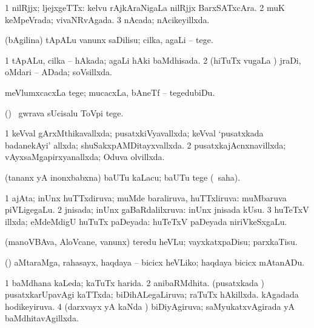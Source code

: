 {\bentry
{} 
\gl{\gu}
\expl{}
\bmng
\bnum
\num{1} nilRjjx; ljejxgeTTx:  kelvu rAjkAraNigaLa nilRjjx BarxSATxcAra. 
\num{2} muK keMpeVrada; vivaNRvAgada. 
\num{3} nAcada; nAcikeyillxda. 
\enum
\emng
\eentry

\bentry
{} 
\gl{\sakirx}
\expl{}
\bmng
(bAgilina) tApALu \mo vanunx saDilisu; cilka, agaLi -- tege. 
\emng
\eentry

\bentry
{} 
\gl{\gu}
\expl{}
\bmng
\bnum
\num{1} tApALu, cilka -- hAkada; agaLi hAki baMdhisada. 
\num{2} (hiTuTx \mo vugaLa \vi) jraDi, oMdari -- ADada; soVsillxda. 
\enum
\emng
\eentry

\bentry
{} 
\gl{\sakirx}
\expl{}
\bmng
meVlumxcacxLa tege; mucacxLa, bAneTf -- tegedubiDu. 
\emng

\noindent 
\gl{\akirx}
\expl{}
\bmng
(\pArxparx) \kanmu\ gwrava sUcisalu ToVpi tege. 
\emng
\eentry
 
\bentry
{} 
\gl{\gu}
\expl{}
\bmng
\bnum
\num{1} keVval gArxMthikavallxda; pusatxkiVyavallxda; keVval `pusatxkada badanekAyi' allxda; shuSakxpAMDitayxvallxda. 
\num{2} pusatxkajAcnxnavillxda; vAyxsaMgapirxyanallxda; Oduva olvillxda. 
\enum
\emng
\eentry

\bentry
{} 
\gl{\akirx}
\expl{}
\bmng
(tananx yA inonxbabxna) baUTu kaLacu; baUTu tege (\akirx\ saha). 
\emng
\eentry

\bentry
{} 
\gl{\gu}
\expl{}
\bmng
\bnum
\num{1} ajAta; inUnx huTTxdiruva; muMde baraliruva, huTTxliruva:  muMbaruva piVLigegaLu. 
\num{2} jnisada; inUnx gaBaRdalilxruva:  inUnx jnisada kUsu. 
\num{3} huTeTxV illxda; eMdeMdigU huTuTx paDeyada:  huTeTxV paDeyada niriVkeSxgaLu. 
\enum
\emng
\eentry

\bentry
{} 
\gl{\sakirx}
\expl{}
\bmng
(manoVBAva, AloVcane, \mo vanunx) teredu heVLu; vayxkatxpaDisu; parxkaTisu. 
\emng

\noindent 
\gl{\pagu}
\expl{}
\bmng
{} (\AtAmx) aMtaraMga, rahasayx, haqdaya -- bicicx heVLiko; haqdaya bicicx mAtanADu. 
\emng
\eentry

\bentry
{} 
\gl{\gu}
\expl{}
\bmng
\bnum
\num{1} baMdhana kaLeda; kaTuTx harida. 
\num{2} anibaRMdhita. 
 (pusatxkada \vi) 
\banum
{} pusatxkarUpavAgi kaTTxda; biDihALegaLiruva; raTuTx hAkillxda. 
 kAgadada hodikeyiruva. 
\eanum
\numie
\num{4} (darxvayx yA kaNda \vi) biDiyAgiruva; saMyukatxvAgirada yA baMdhitavAgillxda. 
\enum
\emng
\eentry

}
